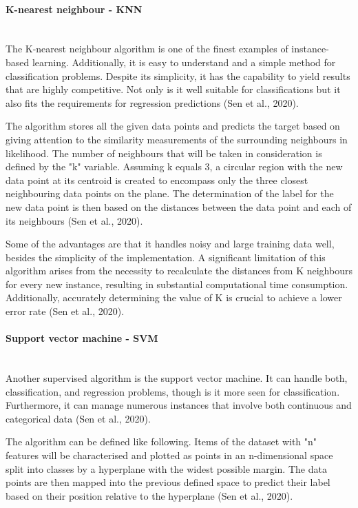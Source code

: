 \documentclass{article}
\begin{document}
\begin{multicols}{2}
\paragraph*{\textbf{K-nearest neighbour - KNN}}\mbox{}\\
The K-nearest neighbour algorithm is one of the finest examples of instance-based learning. Additionally, it is easy to understand and a simple method for classification problems. Despite its simplicity, it has the capability to yield results that are highly competitive. Not only is it well suitable for classifications but it also fits the requirements for regression predictions (Sen et al., 2020).

The algorithm stores all the given data points and predicts the target based on giving attention to the similarity measurements of the surrounding neighbours in likelihood. The number of neighbours that will be taken in consideration is defined by the "k" variable. Assuming k equals 3, a circular region with the new data point at its centroid is created to encompass only the three closest neighbouring data points on the plane. The determination of the label for the new data point is then based on the distances between the data point and each of its neighbours (Sen et al., 2020).

Some of the advantages are that it handles noisy and large training data well, besides the simplicity of the implementation. A significant limitation of this algorithm arises from the necessity to recalculate the distances from K neighbours for every new instance, resulting in substantial computational time consumption. Additionally, accurately determining the value of K is crucial to achieve a lower error rate (Sen et al., 2020).

\paragraph*{\textbf{Support vector machine - SVM}}\mbox{}\\
Another supervised algorithm is the support vector machine. It can handle both, classification, and regression problems, though is it more seen for classification. Furthermore, it can manage numerous instances that involve both continuous and categorical data (Sen et al., 2020).

The algorithm can be defined like following. Items of the dataset with "n" features will be characterised and plotted as points in an n-dimensional space split into classes by a hyperplane with the widest possible margin. The data points are then mapped into the previous defined space to predict their label based on their position relative to the hyperplane (Sen et al., 2020).


\end{multicols}
\end{document}
